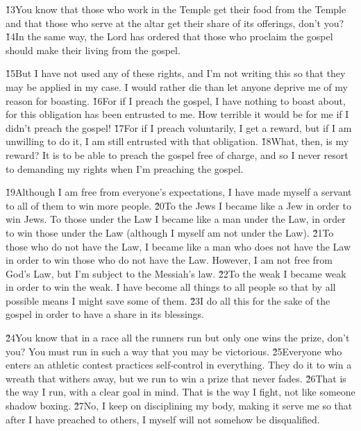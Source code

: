 \v{13}You know that those who work in the Temple get their food from the Temple and that those who serve at the altar get their share of its offerings, don't you? \v{14}In the same way, the Lord has ordered that those who proclaim the gospel should make their living from the gospel.

\v{15}But I have not used any of these rights, and I'm not writing this so that they may be applied in my case. I would rather die than let anyone deprive me of my reason for boasting. \v{16}For if I preach the gospel, I have nothing to boast about, for this obligation has been entrusted to me. How terrible it would be for me if I didn't preach the gospel! \v{17}For if I preach voluntarily, I get a reward, but if I am unwilling to do it, I am still entrusted with that obligation. \v{18}What, then, is my reward? It is to be able to preach the gospel free of charge, and so I never resort to demanding my rights when I'm preaching the gospel.

\v{19}Although I am free from everyone's expectations, I have made myself a servant to all of them to win more people. \v{20}To the Jews I became like a Jew in order to win Jews. To those under the Law I became like a man under the Law, in order to win those under the Law (although I myself am not under the Law). \v{21}To those who do not have the Law, I became like a man who does not have the Law in order to win those who do not have the Law. However, I am not free from God's Law, but I'm subject to the Messiah's law. \v{22}To the weak I became weak in order to win the weak. I have become all things to all people so that by all possible means I might save some of them. \v{23}I do all this for the sake of the gospel in order to have a share in its blessings.

\v{24}You know that in a race all the runners run but only one wins the prize, don't you? You must run in such a way that you may be victorious. \v{25}Everyone who enters an athletic contest practices self-control in everything. They do it to win a wreath that withers away, but we run to win a prize that never fades. \v{26}That is the way I run, with a clear goal in mind. That is the way I fight, not like someone shadow boxing. \v{27}No, I keep on disciplining my body, making it serve me so that after I have preached to others, I myself will not somehow be disqualified.

